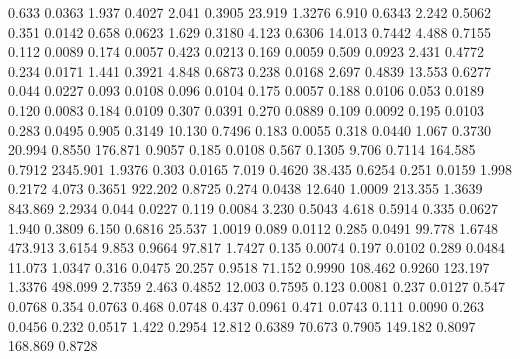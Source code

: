 0.633    0.0363 %
1.937    0.4027 %
2.041    0.3905 %
23.919   1.3276 %
6.910    0.6343 %
2.242    0.5062 %
0.351    0.0142 %
0.658    0.0623 %
1.629    0.3180 %
4.123    0.6306 %
14.013   0.7442 %
4.488    0.7155 %
0.112    0.0089 %
0.174    0.0057 %
0.423    0.0213 %
0.169    0.0059 %
0.509    0.0923 %
2.431    0.4772 %
0.234    0.0171 %
1.441    0.3921 %
4.848    0.6873 %
0.238    0.0168 %
2.697    0.4839 %
13.553   0.6277 %
0.044    0.0227 %
0.093    0.0108 %
0.096    0.0104 %
0.175    0.0057 %
0.188    0.0106 %
0.053    0.0189 %
0.120    0.0083 %
0.184    0.0109 %
0.307    0.0391 %
0.270    0.0889 %
0.109    0.0092 %
0.195    0.0103 %
0.283    0.0495 %
0.905    0.3149 %
10.130   0.7496 %
0.183    0.0055 %
0.318    0.0440 %
1.067    0.3730 %
20.994   0.8550 %
176.871  0.9057 %
0.185    0.0108 %
0.567    0.1305 %
9.706    0.7114 %
164.585  0.7912 %
2345.901 1.9376 %
0.303    0.0165 %
7.019    0.4620 %
38.435   0.6254 %
0.251    0.0159 %
1.998    0.2172 %
4.073    0.3651 %
922.202  0.8725 %
0.274    0.0438 %
12.640   1.0009 %
213.355  1.3639 %
843.869  2.2934 %
0.044    0.0227 %
0.119    0.0084 %
3.230    0.5043 %
4.618    0.5914 %
0.335    0.0627 %
1.940    0.3809 %
6.150    0.6816 %
25.537   1.0019 %
0.089    0.0112 %
0.285    0.0491 %
99.778   1.6748 %
473.913  3.6154 %
9.853    0.9664 %
97.817   1.7427 %
0.135    0.0074 %
0.197    0.0102 %
0.289    0.0484 %
11.073   1.0347 %
0.316    0.0475 %
20.257   0.9518 %
71.152   0.9990 %
108.462  0.9260 %
123.197  1.3376 %
498.099  2.7359 %
2.463    0.4852 %
12.003   0.7595 %
0.123    0.0081 %
0.237    0.0127 %
0.547    0.0768 %
0.354    0.0763 %
0.468    0.0748 %
0.437    0.0961 %
0.471    0.0743 %
0.111    0.0090 %
0.263    0.0456 %
0.232    0.0517 %
1.422    0.2954 %
12.812   0.6389 %
70.673   0.7905 %
149.182  0.8097 %
168.869  0.8728 %
